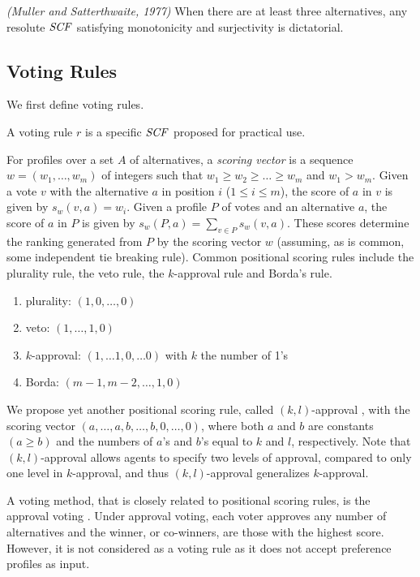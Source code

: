 \begin{thm}
\label{thm:Mull_Satt}
\emph{(Muller and Satterthwaite, 1977)}
	When there are at least three alternatives,
	any resolute $\it{SCF}$ satisfying monotonicity and surjectivity is dictatorial.
\end{thm}



\subsection{Voting Rules}
We first define voting rules.

\begin{definition}
	A voting rule $r$ is a specific $\it{SCF}$ proposed for practical use.
\end{definition}

For profiles over a set $A$ of alternatives, 
a \emph{scoring vector} is a sequence $w= (w_1,\ldots,
w_m)$ of integers such that $w_1\geq w_2 \geq \ldots \geq w_m$
and $w_1 > w_m$. Given a vote
$v$ with the alternative $a$ in position $i$ ($1 \leq i \leq m$), 
the score of $a$ in
$v$ is given
by $s_w(v,a)=w_i$. Given a profile $P$ of votes and an alternative $a$,
the score of $a$ in $P$ is given by $s_w(P,a) = \sum_{v\in P} s_w(v,a)$. 
These scores determine the ranking generated from $P$ by the scoring
vector $w$ (assuming, as is common, some independent tie breaking rule). 
Common positional scoring rules include the plurality rule,
the veto rule, the $k$-approval rule and Borda's rule.
\begin{enumerate} \itemsep -4pt
	\item plurality: $(1,0,\ldots,0)$
	\item veto: $(1,\ldots,1,0)$
	\item $k$-approval: $(1,\ldots 1,0,\ldots 0)$ with $k$ the number of 1's
	\item Borda: $(m-1,m-2,\ldots, 1,0)$
\end{enumerate}

We propose yet another positional scoring rule, called $(k,l)$-approval \cite{LiuT},
with the scoring vector $(a,\ldots,a,b,\ldots,b,0,\ldots,0)$, where
both $a$ and $b$ are constants $(a \geq b)$ and the numbers of $a$'s and $b$'s equal to
$k$ and $l$, respectively.
Note that $(k,l)$-approval allows agents to specify two levels of approval,
compared to only one level in $k$-approval, and thus $(k,l)$-approval
generalizes $k$-approval.

A voting method, that is closely related to positional scoring rules, is
the approval voting \cite{BraFis}.
Under approval voting, each voter approves any number of alternatives
and the winner, or co-winners, are those with the highest score.
However, it is not considered as a voting rule as it does not
accept preference profiles as input.

